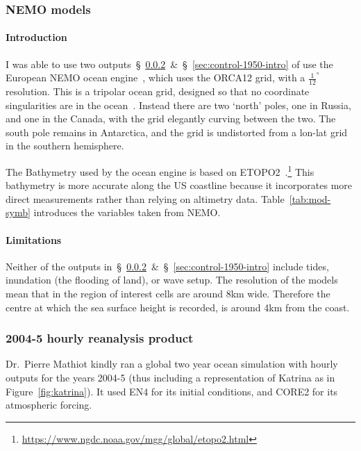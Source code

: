 \subsubsection{NEMO models}
\paragraph{Introduction}
\label{sec:nemo}
I was able to use two outputs~§~\ref{sec:rean-prod}~\&~§~\ref{sec:control-1950-intro}
of use the European NEMO ocean engine~\cite{madec2015nemo}, which uses the ORCA12 grid, with a  $\frac{1}{12}^{\circ}$
resolution.
This is a tripolar ocean grid, designed so that no coordinate singularities are in the ocean~\cite{madec1996global}.
Instead there are two `north' poles, one in Russia, and one in the Canada,
with the grid elegantly curving between the two.
The south pole remains in Antarctica, and the grid is undistorted from a lon-lat
 grid in the southern hemisphere.

 The Bathymetry used by the ocean engine is based on
 ETOPO2~\cite{lecointre2011definition,noaa20062}.\footnote{\url{https://www.ngdc.noaa.gov/mgg/global/etopo2.html}}
 This bathymetry is more accurate along the US coastline because it incorporates
 more direct measurements rather than relying on altimetry data. Table~\ref{tab:mod-symb}
 introduces the variables taken from NEMO.



\paragraph{Limitations}

Neither of the outputs in~§~\ref{sec:rean-prod}~\&~§~\ref{sec:control-1950-intro}
include tides, inundation (the flooding of land), or wave setup.
The resolution of the models mean that in the region of interest cells are around
8km wide. Therefore the centre at which the sea surface height is recorded,
is around 4km from the coast.

\subsubsection{2004-5 hourly reanalysis product}
\label{sec:rean-prod}
Dr.~Pierre Mathiot kindly ran a global two year ocean simulation with
hourly outputs for the years 2004-5 (thus including a representation of Katrina as
in Figure~\ref{fig:katrina}).
It used EN4 for its initial conditions,
and CORE2 for its atmospheric forcing.

